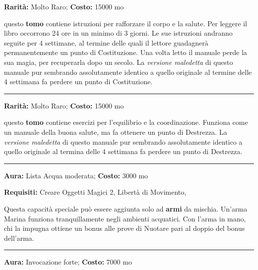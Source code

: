 \begin{multicols}{2}
\textbf{Rarità:} Molto Raro; \textbf{Costo:} 15000 mo

questo \textbf{tomo} contiene istruzioni per rafforzare il corpo e la salute. Per leggere il libro occorrono 24 ore in un minimo di 3 giorni. Le sue istruzioni andranno seguite per 4 settimane, al termine delle quali il lettore guadagnerà permanentemente un punto di Costituzione. Una volta letto il manuale perde la sua magia, per recuperarla dopo un secolo. La \emph{versione maledetta} di questo manuale pur sembrando assolutamente identico a quello originale al termine delle 4 settimana fa perdere un punto di Costituzione.

\smallskip\noindent\rule{\linewidth}{2pt}  \hypertarget{ManualedellaVelocitàdiazione}{}\smallskip{}\noindent\label{ManualedellaVelocitàdiazione}

\textbf{Rarità:} Molto Raro; \textbf{Costo:} 15000 mo

questo \textbf{tomo} contiene esercizi per l'equilibrio e la coordinazione. Funziona come un manuale della buona salute, ma fa ottenere un punto di Destrezza. La \emph{versione maledetta} di questo manuale pur sembrando assolutamente identico a quello originale al termina delle 4 settimana fa perdere un punto di Destrezza.

\smallskip\noindent\rule{\linewidth}{2pt}  \hypertarget{Marina}{}\smallskip{}\noindent\label{Marina}

\textbf{Aura:} Lista Acqua moderata; \textbf{Costo:} 3000 mo

\textbf{Requisiti:} Creare Oggetti Magici 2, Libertà di Movimento,

Questa capacità speciale può essere aggiunta solo ad \textbf{armi} da mischia. Un'arma Marina funziona tranquillamente negli ambienti acquatici. Con l'arma in mano, chi la impugna ottiene un bonus alle prove di Nuotare pari al doppio del bonus dell'arma.

\smallskip\noindent\rule{\linewidth}{2pt}  \hypertarget{MazzadellaPunizione}{}\smallskip{}\noindent\label{MazzadellaPunizione}

\textbf{Aura:} Invocazione forte; \textbf{Costo:} 7000 mo


\end{multicols}

